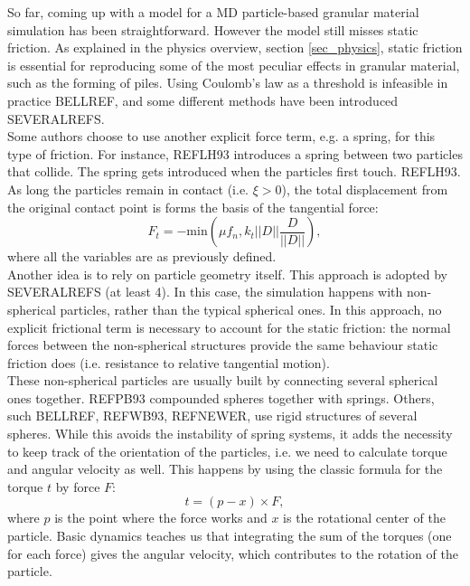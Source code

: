 So far, coming up with a model for a MD particle-based granular material simulation has been straightforward. However the model still misses static friction. As explained in the physics overview, section \ref{sec_physics}, static friction is essential for reproducing some of the most peculiar effects in granular material, such as the forming of piles. Using Coulomb's law as a threshold is infeasible in practice BELLREF, and some different methods have been introduced SEVERALREFS.\\

Some authors choose to use another explicit force term, e.g. a spring, for this type of friction. For instance, REFLH93 introduces a spring between two particles that collide. The spring gets introduced when the particles first touch. REFLH93. As long the particles remain in contact (i.e. $\xi > 0$), the total displacement from the original contact point is forms the basis of the tangential force:
\begin{equation}
F_t = - \mathrm{min}(\mu f_n, k_t ||D|| \frac{D}{||D||}),
\end{equation} 
where all the variables are as previously defined.\\

Another idea is to rely on particle geometry itself. This approach is adopted by SEVERALREFS (at least 4). In this case, the simulation happens with non-spherical particles, rather than the typical spherical ones. In this approach, no explicit frictional term is necessary to account for the static friction: the normal forces between the non-spherical structures provide the same behaviour static friction does (i.e. resistance to relative tangential motion).\\

These non-spherical particles are usually built by connecting several spherical ones together. REFPB93 compounded spheres together with springs. Others, such BELLREF, REFWB93, REFNEWER, use rigid structures of several spheres. While this avoids the instability of spring systems, it adds the necessity to keep track of the orientation of the particles, i.e. we need to calculate torque and angular velocity as well. This happens by using the classic formula for the  torque $t$ by force $F$:
\begin{equation}
t = (p - x) \times F,
\end{equation} 
where $p$ is the point where the force works and $x$ is the rotational center of the particle. Basic dynamics teaches us that integrating the sum of the torques (one for each force) gives the angular velocity, which contributes to the rotation of the particle.\\

